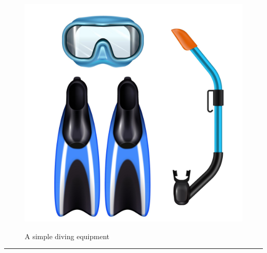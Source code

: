 \documentclass{article}
\begin{document}
    \begin{figure}[H]
        \centering
        \begin{minipage}{0.25\textwidth}
            \centering
            \includegraphics[width=\textwidth]{../SurvivalItemImages/divingequipment}
        \end{minipage}\hfill
        \begin{minipage}{0.7\textwidth}
            \centering
            \Large A simple diving equipment
        \end{minipage}
    \end{figure}
    \vspace{-0.8em}
    \noindent\rule{\textwidth}{0.4pt}
            
\end{document}
